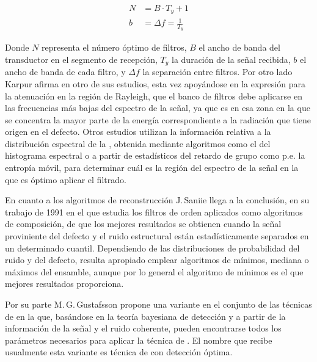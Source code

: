 \begin{equation}
	\begin{split}
		N & = B\cdot T_y + 1 \\	
		b & = \Delta f = \frac{1}{T_y}
	\end{split}
\end{equation}

Donde $N$ representa el número óptimo de filtros, $B$ el ancho de banda del
transductor en el segmento de recepción, $T_y$ la duración de la señal
recibida, $b$ el ancho de banda de cada filtro, y $\Delta f$ la separación
entre filtros. Por otro lado Karpur afirma en otro de sus estudios, esta
vez apoyándose en la expresión para la atenuación en la región de Rayleigh,
que el banco de filtros debe aplicarse en las frecuencias más bajas del
espectro de la señal, ya que es en esa zona en la que se concentra la mayor
parte de la energía correspondiente a la radiación que tiene origen en el
defecto. Otros estudios utilizan la información relativa a la distribución
espectral de la , obtenida mediante algoritmos como el del
histograma espectral o a partir de estadísticos del retardo de grupo como
p.e. la entropía móvil, para determinar cuál es la región del espectro de
la señal en la que es óptimo aplicar el filtrado.

En cuanto a los algoritmos de reconstrucción J.\,Saniie llega a la
conclusión, en su trabajo de 1991 en el que estudia los filtros de orden
aplicados como algoritmos de composición, de que los mejores resultados se
obtienen cuando la señal proviniente del defecto y el ruido estructural
están estadísticamente separados en un determinado cuantil. Dependiendo de
las distribuciones de probabilidad del ruido y del defecto, resulta
apropiado emplear algoritmos de mínimos, mediana o máximos del ensamble,
aunque por lo general el algoritmo de mínimos es el que mejores resultados
proporciona.

Por su parte M.\,G.\,Gustafsson propone una variante en el conjunto de las
técnicas de  en la que, basándose en la teoría bayesiana de
detección y a partir de la información de la señal y el ruido coherente,
pueden encontrarse todos los parámetros necesarios para aplicar la técnica
de . El nombre que recibe usualmente esta variante es técnica de
 con detección óptima.
